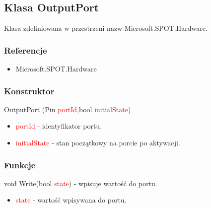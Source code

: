 \documentclass{article}
\begin{document}
\subsection{Klasa OutputPort}
Klasa zdefiniowana w przestrzeni nazw Microsoft.SPOT.Hardware.
\subsubsection{Referencje}
\begin{itemize}
\item Microsoft.SPOT.Hardware
\end{itemize}
\subsubsection{Konstruktor}
 OutputPort (Pin \textcolor{red}{portId},bool \textcolor{red}{initialState})
\begin{itemize}
\item \textcolor{red}{portId} - identyfikator portu.
\item \textcolor{red}{initialState} - stan początkowy na porcie po aktywacji.
\end{itemize}
\subsubsection{Funkcje}
void Write(bool \textcolor{red}{state}) - wpisuje wartość do portu.
\begin{itemize}
\item \textcolor{red}{state} - wartość wpisywana do portu.
\end{itemize}
\end{document}
